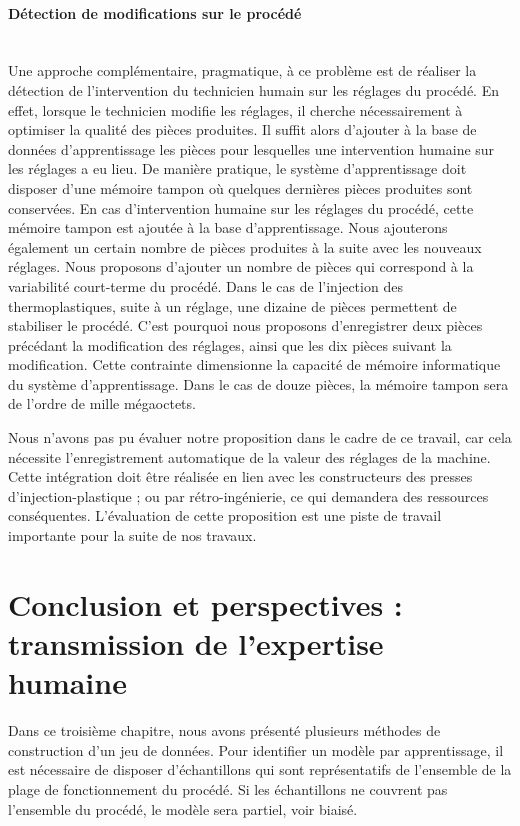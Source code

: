 \paragraph{Détection de modifications sur le procédé}\mbox{} \label{subsec:labelling_detection} \\
Une approche complémentaire, pragmatique, à ce problème est de réaliser la détection de l'intervention du technicien humain sur les réglages du procédé.
En effet, lorsque le technicien modifie les réglages, il cherche nécessairement à optimiser la qualité des pièces produites.
Il suffit alors d'ajouter à la base de données d'apprentissage les pièces pour lesquelles une intervention humaine sur les réglages a eu lieu.
De manière pratique, le système d'apprentissage doit disposer d'une mémoire tampon où quelques dernières pièces produites sont conservées.
En cas d'intervention humaine sur les réglages du procédé, cette mémoire tampon est ajoutée à la base d'apprentissage.
Nous ajouterons également un certain nombre de pièces produites à la suite avec les nouveaux réglages.
Nous proposons d'ajouter un nombre de pièces qui correspond à la variabilité court-terme du procédé.
Dans le cas de l'injection des thermoplastiques, suite à un réglage, une dizaine de pièces permettent de stabiliser le procédé.
C'est pourquoi nous proposons d'enregistrer deux pièces précédant la modification des réglages, ainsi que les dix pièces suivant la modification.
Cette contrainte dimensionne la capacité de mémoire informatique du système d'apprentissage.
Dans le cas de douze pièces, la mémoire tampon sera de l'ordre de mille mégaoctets.

Nous n'avons pas pu évaluer notre proposition dans le cadre de ce travail, car cela nécessite l'enregistrement automatique de la valeur des réglages de la machine.
Cette intégration doit être réalisée en lien avec les constructeurs des presses d'injection-plastique ; ou par rétro-ingénierie, ce qui demandera des ressources conséquentes.
L'évaluation de cette proposition est une piste de travail importante pour la suite de nos travaux.


\section{Conclusion et perspectives : transmission de l'expertise humaine} \label{sec:dataset_conclusion}
Dans ce troisième chapitre, nous avons présenté plusieurs méthodes de construction d'un jeu de données.
Pour identifier un modèle par apprentissage, il est nécessaire de disposer d'échantillons qui sont représentatifs de l'ensemble de la plage de fonctionnement du procédé.
Si les échantillons ne couvrent pas l'ensemble du procédé, le modèle sera partiel, voir biaisé.


